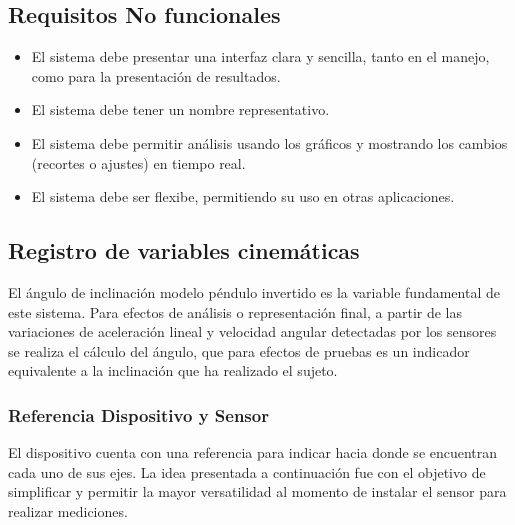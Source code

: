 \documentclass[12pt,a4paper]{article}
\begin{document}
\subsection{Requisitos No funcionales}
\begin{itemize}
	\item El sistema debe presentar una interfaz clara y sencilla, tanto en el manejo, como para la presentación de resultados.
	\item El sistema debe tener un nombre representativo.
	\item El sistema debe permitir análisis usando los gráficos y mostrando los cambios (recortes o ajustes) en tiempo real.
	\item El sistema debe ser flexibe, permitiendo su uso en otras aplicaciones.
\end{itemize}

\newpage
\subsection{Registro de variables cinemáticas}
El ángulo de inclinación modelo péndulo invertido\cite{gage_kinematic_2004} es la variable fundamental de este sistema.
Para efectos de análisis o representación final, a partir de las variaciones de aceleración lineal y velocidad angular detectadas por los sensores se realiza el cálculo del ángulo, que para efectos de pruebas es un indicador equivalente a la inclinación que ha realizado el sujeto.

\subsubsection{Referencia Dispositivo y Sensor}
El dispositivo cuenta con una referencia para indicar hacia donde se encuentran cada uno de sus ejes. La idea presentada a continuación fue con el objetivo de simplificar y permitir la mayor versatilidad al momento de instalar el sensor para realizar mediciones.
\end{document}
